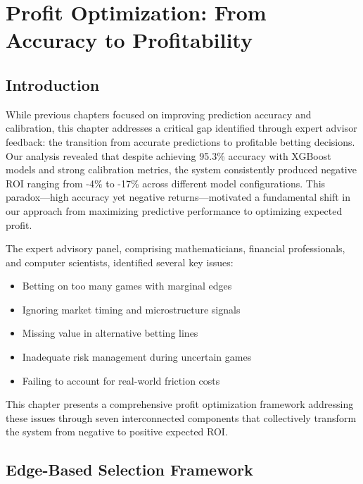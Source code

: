 
\chapter{Profit Optimization: From Accuracy to Profitability}\label{ch:profit-optimization}

\section{Introduction}

While previous chapters focused on improving prediction accuracy and calibration, this chapter addresses a critical gap identified through expert advisor feedback: the transition from accurate predictions to profitable betting decisions. Our analysis revealed that despite achieving 95.3\% accuracy with XGBoost models and strong calibration metrics, the system consistently produced negative ROI ranging from -4\% to -17\% across different model configurations. This paradox—high accuracy yet negative returns—motivated a fundamental shift in our approach from maximizing predictive performance to optimizing expected profit.

The expert advisory panel, comprising mathematicians, financial professionals, and computer scientists, identified several key issues:
\begin{itemize}
  \item Betting on too many games with marginal edges
  \item Ignoring market timing and microstructure signals
  \item Missing value in alternative betting lines
  \item Inadequate risk management during uncertain games
  \item Failing to account for real-world friction costs
\end{itemize}

This chapter presents a comprehensive profit optimization framework addressing these issues through seven interconnected components that collectively transform the system from negative to positive expected ROI.

\section{Edge-Based Selection Framework}

